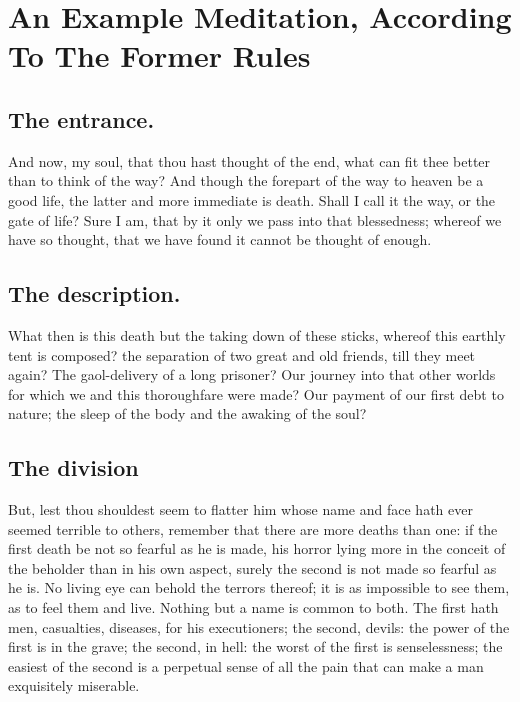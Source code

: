 \meditation
\chapter{An Example Meditation, According To The Former Rules}
\section{The entrance.}
And now, my soul, that thou hast thought of the end, what can fit thee better than to think of the way? And though the forepart of the way to heaven be a good life, the latter and more immediate is death. Shall I call it the way, or the gate of life? Sure I am, that by it only we pass into that blessedness; whereof we have so thought, that we have found it cannot be thought of enough. 

\section{The description.}
What then is this death but the taking down of these sticks, whereof this earthly tent is composed? the separation of two great and old friends, till they meet again? The gaol-delivery of a long prisoner? Our journey into that other worlds for which we and this thoroughfare were made? Our payment of our first debt to nature; the sleep of the body and the awaking of the soul? 

\section{The division}
But, lest thou shouldest seem to flatter him whose name and face hath ever seemed terrible to others, remember that there are more deaths than one: if the first death be not so fearful as he is made, his horror lying more in the conceit of the beholder than in his own aspect, surely the second is not made so fearful as he is. No living eye can behold the terrors thereof; it is as impossible to see them, as to feel them and live. Nothing but a name is common to both. The first hath men, casualties, diseases, for his executioners; the second, devils: the power of the first is in the grave; the second, in hell: the worst of the first is senselessness; the easiest of the second is a perpetual sense of all the pain that can make a man exquisitely miserable. 

